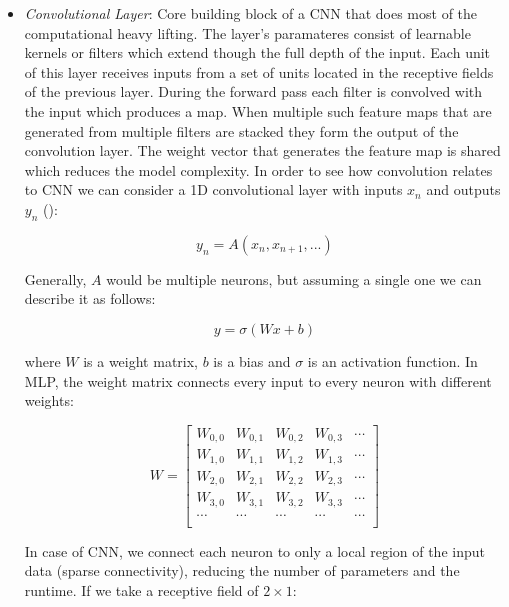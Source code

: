 \documentclass[12pt,a4paper,authoryear]{elsarticle}
\begin{document}
	 \begin{itemize}
	 	\item \textit{Convolutional Layer}: Core building block of a CNN that does most of the computational heavy lifting. The layer's paramateres consist of learnable kernels or filters which extend though the full depth of the input. Each unit of this layer receives inputs from a set of units located in the receptive fields of the previous layer. During the forward pass each filter is convolved with the input which produces a map. When multiple such feature maps that are generated from multiple filters are stacked they form the output of the convolution layer. The weight vector that generates the feature map is shared which reduces the model complexity. In order to see how convolution relates to CNN we can consider a 1D convolutional layer with inputs $x_n$ and outputs $y_n$ (\cite{colah}):
	 	
	 	\begin{equation}
		 	y_n = A(x_n,x_{n+1},...)
	 	\end{equation}
	 	
	 	Generally, $A$ would be multiple neurons, but assuming a single one we can describe it as follows:
	 	
	 	\begin{equation}
		 	y = \sigma(Wx+b)
	 	\end{equation}
	 	
	 	where $W$ is a weight matrix, $b$ is a bias and $\sigma$ is an activation function. In MLP, the weight matrix connects every input to every neuron with different weights:
	 	
	 	\begin{equation}
		 	W=\left[\begin{array}{ccccc} W_{0,0} & W_{0,1} & W_{0,2} & W_{0,3} & \cdots \\
		 	W_{1,0} & W_{1,1} & W_{1,2} & W_{1,3} & \cdots \\
		 	W_{2,0} & W_{2,1} & W_{2,2} & W_{2,3} & \cdots \\
		 	W_{3,0} & W_{3,1} & W_{3,2} & W_{3,3} & \cdots \\
		 	\cdots & \cdots & \cdots & \cdots & \cdots \\ 
		 	\end{array}\right]
	 	\end{equation}
	 	
	 	In case of CNN, we connect each neuron to only a local region of the input data (sparse connectivity), reducing the number of parameters and the runtime. If we take a receptive field of $2\times 1$:
	 	

\end{itemize}
\end{document}

